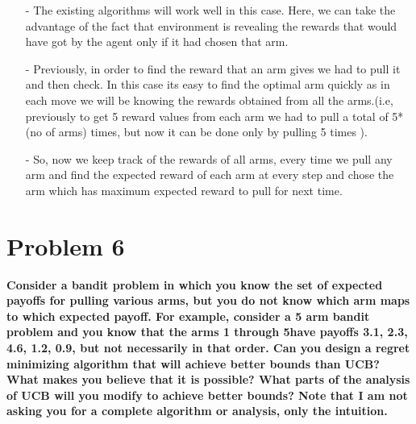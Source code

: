 \documentclass [11pt]{article}
\numberwithin{equation}{section}
\begin{document}
\begin{itemize}
    \item[-] The existing algorithms will work well in this case. Here, we can take the advantage of the fact that environment is revealing the rewards that would have got by the agent only if it had chosen that arm.
    
    \item[-] Previously, in order to find the reward that an arm gives we had to pull it and then check. In this case its easy to find the optimal arm quickly as in each move we will be knowing the rewards obtained from all the arms.(i.e, previously to get 5 reward values from each arm we had to pull a total of 5*(no of arms) times, but now it can be done only by pulling 5 times ).
    
    \item[-] So, now we keep track of the rewards of all arms, every time we pull any arm and find the expected reward of each arm at every step and chose the arm which has maximum expected reward to pull for next time. 

\end{itemize}

\vspace{0.5cm}

\section*{Problem 6}
\textbf{Consider a bandit problem in which you know the set of expected payoffs for pulling various arms, but you do not know which arm maps to which expected payoff. For example, consider a 5 arm bandit problem and you know that the arms 1 through 5have payoffs 3.1, 2.3, 4.6, 1.2, 0.9, but not necessarily in that order. Can you design a regret minimizing algorithm that will achieve better bounds than UCB? What makes you believe that it is possible? What parts of the analysis of UCB will you modify to achieve better bounds? Note that I am not asking you for a complete algorithm or analysis, only the intuition.}
\end{document}
